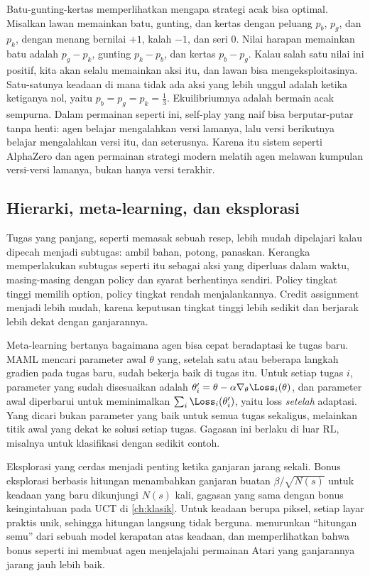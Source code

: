 Batu-gunting-kertas memperlihatkan mengapa strategi acak bisa optimal. Misalkan lawan memainkan batu, gunting, dan kertas
dengan peluang $p_b$, $p_g$, dan $p_k$, dengan menang bernilai $+1$, kalah $-1$, dan seri $0$. Nilai harapan memainkan batu
adalah $p_g-p_k$, gunting $p_k-p_b$, dan kertas $p_b-p_g$. Kalau salah satu nilai ini positif, kita akan selalu memainkan aksi
itu, dan lawan bisa mengeksploitasinya. Satu-satunya keadaan di mana tidak ada aksi yang lebih unggul adalah ketika ketiganya
nol, yaitu $p_b=p_g=p_k=\tfrac13$. Ekuilibriumnya adalah bermain acak sempurna. Dalam permainan seperti ini, self-play yang
naif bisa berputar-putar tanpa henti: agen belajar mengalahkan versi lamanya, lalu versi berikutnya belajar mengalahkan versi
itu, dan seterusnya. Karena itu sistem seperti AlphaZero \citep{silver2018} dan agen permainan strategi modern melatih agen
melawan kumpulan versi-versi lamanya, bukan hanya versi terakhir.

\subsection{Hierarki, meta-learning, dan eksplorasi}

Tugas yang panjang, seperti memasak sebuah resep, lebih mudah dipelajari kalau dipecah menjadi subtugas: ambil bahan, potong,
panaskan. Kerangka  \citep{sutton1999} memperlakukan subtugas seperti itu sebagai aksi yang diperluas dalam
waktu, masing-masing dengan policy dan syarat berhentinya sendiri. Policy tingkat tinggi memilih option, policy tingkat rendah
menjalankannya. Credit assignment menjadi lebih mudah, karena keputusan tingkat tinggi lebih sedikit dan berjarak lebih dekat
dengan ganjarannya.

Meta-learning bertanya bagaimana agen bisa cepat beradaptasi ke tugas baru. MAML \citep{finn2017} mencari parameter awal $\theta$
yang, setelah satu atau beberapa langkah gradien pada tugas baru, sudah bekerja baik di tugas itu. Untuk setiap tugas $i$,
parameter yang sudah disesuaikan adalah $\theta_i'=\theta-\alpha\nabla_\theta\Loss_i(\theta)$, dan parameter awal diperbarui untuk
meminimalkan $\sum_i\Loss_i(\theta_i')$, yaitu loss \emph{setelah} adaptasi. Yang dicari bukan parameter yang baik untuk semua
tugas sekaligus, melainkan titik awal yang dekat ke solusi setiap tugas. Gagasan ini berlaku di luar RL, misalnya untuk
klasifikasi dengan sedikit contoh.

Eksplorasi yang cerdas menjadi penting ketika ganjaran jarang sekali. Bonus eksplorasi berbasis hitungan menambahkan ganjaran
buatan $\beta/\sqrt{N(s)}$ untuk keadaan yang baru dikunjungi $N(s)$ kali, gagasan yang sama dengan bonus keingintahuan pada UCT
di \cref{ch:klasik}. Untuk keadaan berupa piksel, setiap layar praktis unik, sehingga hitungan langsung tidak berguna.
\citet{bellemare2016} menurunkan ``hitungan semu'' dari sebuah model kerapatan atas keadaan, dan memperlihatkan bahwa bonus
seperti ini membuat agen menjelajahi permainan Atari yang ganjarannya jarang jauh lebih baik.

